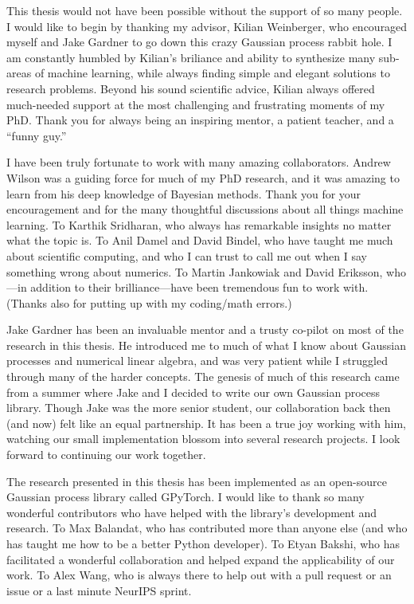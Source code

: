 This thesis would not have been possible without the support of so many people.
I would like to begin by thanking my advisor, Kilian Weinberger, who encouraged myself and Jake Gardner to go down this crazy Gaussian process rabbit hole.
I am constantly humbled by Kilian's briliance and ability to synthesize many sub-areas of machine learning, while always finding simple and elegant solutions to research problems.
Beyond his sound scientific advice, Kilian always offered much-needed support at the most challenging and frustrating moments of my PhD.
Thank you for always being an inspiring mentor, a patient teacher, and a ``funny guy.''

I have been truly fortunate to work with many amazing collaborators.
Andrew Wilson was a guiding force for much of my PhD research, and it was amazing to learn from his deep knowledge of Bayesian methods.
Thank you for your encouragement and for the many thoughtful discussions about all things machine learning.
To Karthik Sridharan, who always has remarkable insights no matter what the topic is.
To Anil Damel and David Bindel, who have taught me much about scientific computing, and who I can trust to call me out when I say something wrong about numerics.
To Martin Jankowiak and David Eriksson, who---in addition to their brilliance---have been tremendous fun to work with.
(Thanks also for putting up with my coding/math errors.)

Jake Gardner has been an invaluable mentor and a trusty co-pilot on most of the research in this thesis.
He introduced me to much of what I know about Gaussian processes and numerical linear algebra, and was very patient while I struggled through many of the harder concepts.
The genesis of much of this research came from a summer where Jake and I decided to write our own Gaussian process library.
Though Jake was the more senior student, our collaboration back then (and now) felt like an equal partnership.
It has been a true joy working with him, watching our small implementation blossom into several research projects.
I look forward to continuing our work together.

The research presented in this thesis has been implemented as an open-source Gaussian process library called GPyTorch.
I would like to thank so many wonderful contributors who have helped with the library's development and research.
To Max Balandat, who has contributed more than anyone else (and who has taught me how to be a better Python developer).
To Etyan Bakshi, who has facilitated a wonderful collaboration and helped expand the applicability of our work.
To Alex Wang, who is always there to help out with a pull request or an issue or a last minute NeurIPS sprint.

